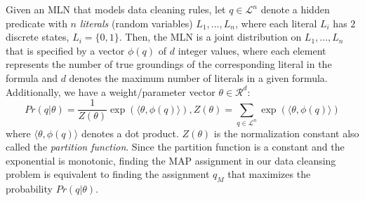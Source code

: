 


Given an MLN that models data cleaning rules, let $q \in \mathcal{L}^n$ denote a hidden predicate with $n$ \emph{literals} (random variables) $L_1,...,L_n$, where each literal $L_i$
has $2$ discrete states, $L_i = \lbrace 0,1 \rbrace$.
Then, the MLN is a joint distribution on  $L_1,...,L_n$ that 
is specified by a vector $\phi(q)$ of $d$ integer values, where
each element represents the number of true groundings of the 
corresponding literal in the formula and $d$ denotes the 
maximum number of literals in a given formula. Additionally, 
we have a weight/parameter vector $\theta \in \mathcal{R}^d$:
\begin{equation*}
Pr \left( q | \theta \right) = 
\frac{1}{Z(\theta)} \exp\left( \langle \theta, \phi(q) \rangle  \right), 
Z(\theta) = \sum_{q \in \mathcal{L}^n}\exp\left( \langle \theta, \phi(q) \rangle  \right) 
\end{equation*}
where $\langle \theta, \phi(q) \rangle$ denotes a dot product. 
$Z(\theta)$ is the normalization constant also called the 
\emph{partition function}. Since the partition function is a constant and the exponential is monotonic, finding the MAP assignment in our data cleansing problem is equivalent to finding the assignment $q_M$ that maximizes the probability $Pr \left( q | \theta \right)$.

